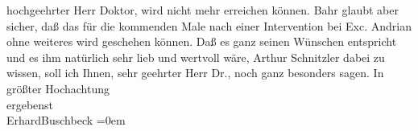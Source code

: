 \begin{ledgroupsized}[t]{13cm}
               hochgeehrter Herr Doktor, wird nicht mehr erreichen können. Bahr glaubt aber sicher, daß das für die kommenden Male nach
               einer Intervention bei Exc. Andrian ohne weiteres
               wird geschehen können. Daß es ganz seinen Wünschen entspricht und es ihm natürlich
               sehr lieb \introOben{}und wertvoll\introOben{} wäre, Arthur Schnitzler dabei zu
               wissen, soll ich Ihnen, sehr geehrter Herr Dr., noch ganz besonders sagen.\pend
           \pstart
           In größter Hochachtung{\\[\baselineskip]}ergebenst{\\[\baselineskip]}\spacefill\mbox{ErhardBuschbeck}\pend
           \leftskip=0em{}\endnumbering{}\end{ledgroupsized}  \newcommand{\dateiname}{L02305}\newcommand{\titel}{Erhard Buschbeck an Arthur Schnitzler, 24. 9. 1918}\newcommand{\editorInnen}{ Martin Anton Müller und Gerd-Hermann Susen}
            \footnotesize
\begin{ledgroupsized}[t]{11.5cm}
\end{ledgroupsized}
         
      